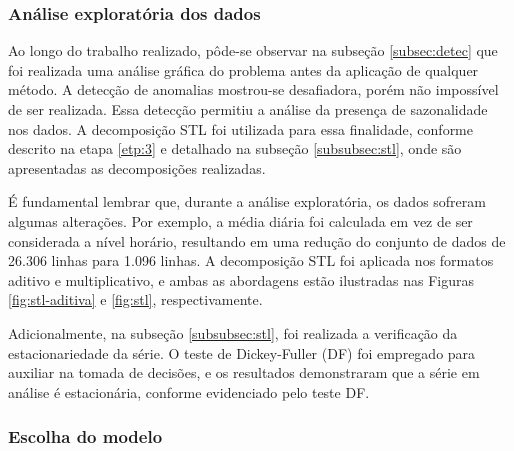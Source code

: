 \subsubsection{An\'alise explorat\'oria dos dados}


Ao longo do trabalho realizado, pôde-se observar na subseção \ref{subsec:detec} que foi realizada uma análise gráfica do problema antes da aplicação de qualquer método. A detecção de anomalias mostrou-se desafiadora, porém não impossível de ser realizada. Essa detecção permitiu a análise da presença de sazonalidade nos dados. A decomposição STL foi utilizada para essa finalidade, conforme descrito na etapa \ref{etp:3} e detalhado na subseção \ref{subsubsec:stl}, onde são apresentadas as decomposições realizadas.

É fundamental lembrar que, durante a análise exploratória, os dados sofreram algumas alterações. Por exemplo, a média diária foi calculada em vez de ser considerada a nível horário, resultando em uma redução do conjunto de dados de 26.306 linhas para 1.096 linhas. A decomposição STL foi aplicada nos formatos aditivo e multiplicativo, e ambas as abordagens estão ilustradas nas Figuras \ref{fig:stl-aditiva} e \ref{fig:stl}, respectivamente.

Adicionalmente, na subseção \ref{subsubsec:stl}, foi realizada a verificação da estacionariedade da série. O teste de Dickey-Fuller (DF) foi empregado para auxiliar na tomada de decisões, e os resultados demonstraram que a série em análise é estacionária, conforme evidenciado pelo teste DF.



\subsubsection{Escolha do modelo}


